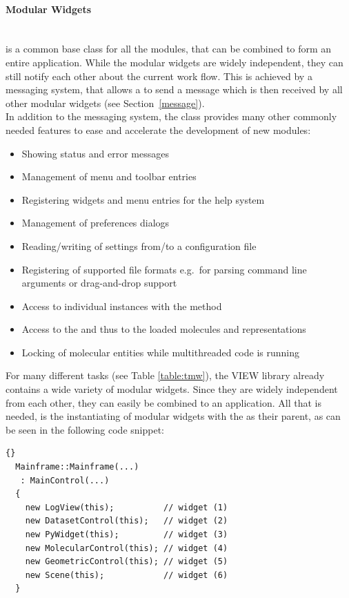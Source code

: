 \paragraph{Modular Widgets}
\hspace*{\fill}\\
 is a common base class for all the modules, that can be combined to
form an entire application.
While the modular widgets are widely independent, they can still notify each other about 
the current work flow. 
This is achieved by a messaging system, that allows a  to send a 
message which is then received by all other modular widgets (see Section~\ref{message}).
\\
In addition to the messaging system, the  class provides many other 
commonly needed features to ease and accelerate the development of new modules:
\begin{itemize}
\item Showing status and error messages
\item Management of menu and toolbar entries 
\item Registering widgets and menu entries for the help system
\item Management of preferences dialogs
\item Reading/writing of settings from/to a configuration file
\item Registering of supported file formats e.g.\ for parsing command line arguments
or drag-and-drop support
\item Access to individual instances with the method 
\item Access to the  and thus to the loaded molecules and representations
\item Locking of molecular entities while multithreaded code is running
\end{itemize}

For many different tasks (see Table \ref{table:tmw}),
the VIEW library already contains a wide variety of modular widgets.
Since they are widely independent from each other, they can easily
be combined to an application. All that is needed, is the instantiating
of modular widgets with the  as their parent, as can be seen in
the following code snippet:
\begin{lstlisting}{}
  Mainframe::Mainframe(...)
   : MainControl(...)
  {
    new LogView(this);          // widget (1)
    new DatasetControl(this);   // widget (2)
    new PyWidget(this);         // widget (3)
    new MolecularControl(this); // widget (4)
    new GeometricControl(this); // widget (5)
    new Scene(this);            // widget (6)
  }
\end{lstlisting}

